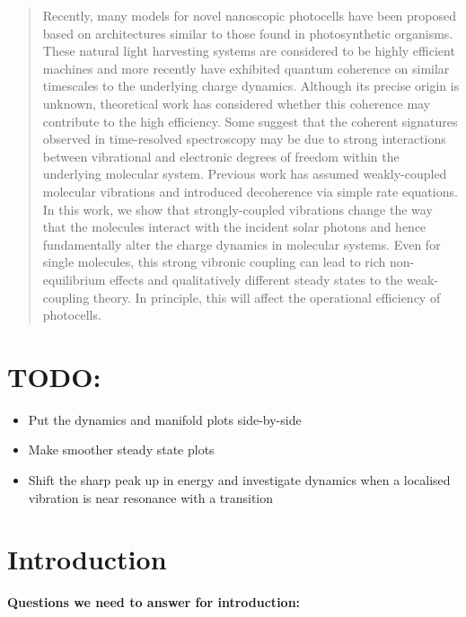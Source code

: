 \documentclass[]{article}
\begin{document}
\begin{abstract}
Recently, many models for novel nanoscopic photocells have been proposed based on architectures similar to those found in photosynthetic organisms. These natural light harvesting systems are considered to be highly efficient machines and more recently have exhibited quantum coherence on similar timescales to the underlying charge dynamics. Although its precise origin is unknown, theoretical work has considered whether this coherence may contribute to the high efficiency. Some suggest that the coherent signatures observed in time-resolved spectroscopy may be due to strong interactions between vibrational and electronic degrees of freedom within the underlying molecular system. 
Previous work has assumed weakly-coupled molecular vibrations and introduced decoherence via simple rate equations. In this work, we show that strongly-coupled vibrations change the way that the molecules interact with the incident solar photons and hence fundamentally alter the charge dynamics in molecular systems. Even for single molecules, this strong vibronic coupling can lead to rich non-equilibrium effects and qualitatively different steady states to the weak-coupling theory. In principle, this will affect the operational efficiency of photocells. \\

\end{abstract}
 
\section{TODO:}
\begin{itemize}
	\item Put the dynamics and manifold plots side-by-side
	\item Make smoother steady state plots
	\item Shift the sharp peak up in energy and investigate dynamics when a localised vibration is near resonance with a transition
\end{itemize}
\section{Introduction}
\textbf{Questions we need to answer for introduction:}
\end{document}
